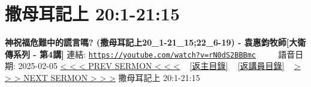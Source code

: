 \documentclass{book}
\begin{document}
\section{撒母耳記上 20:1-21:15}
\label{sec:rN0dS2BBBmc}
\textbf{神祝福危難中的謊言嗎?  (撒母耳記上20\_1-21\_15;22\_6-19) - 袁惠鈞牧師[大衛傳系列 - 第4講]}
\newline
\newline
連結: \href{https://youtube.com/watch?v=rN0dS2BBBmc}{\texttt{https://youtube.com/watch?v=rN0dS2BBBmc}} ~~~~ 語音日期: 2025-02-05
\newline
\newline
\hyperref[sec:9t69tF6ci0k]{< < < PREV SERMON < < <}
~
\hyperlink{toc}{[返主目錄]}
~
\hyperref[ch:preacher11]{[返講員目錄]}
~
\hyperref[sec:WCt7vYrgwVY]{> > > NEXT SERMON > > >}
\newline
\newline
撒母耳記上 20:1-21:15
\newline
\end{document}
